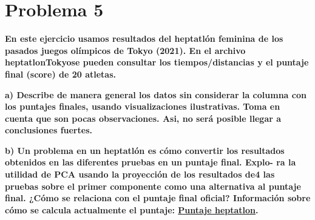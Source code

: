 \section*{Problema 5}

\textbf{En este ejercicio usamos resultados del heptatlón feminina de los pasados juegos olímpicos de Tokyo (2021). En el archivo heptatlonTokyose pueden consultar los tiempos/distancias y el puntaje final (score) de 20 atletas.}

\textbf{a) Describe de manera general los datos sin considerar la columna con los puntajes finales, usando visualizaciones ilustrativas. Toma en cuenta que son pocas observaciones. Asi, no será posible llegar a conclusiones fuertes.}

\textbf{b) Un problema en un heptatlón es cómo convertir los resultados
    obtenidos en las diferentes pruebas en un puntaje final. Explo-
    ra la utilidad de PCA usando la proyección de los resultados de4
    las pruebas sobre el primer componente como una alternativa al
    puntaje final. ¿Cómo se relaciona con el puntaje final oficial?
    Información sobre cómo se calcula actualmente el puntaje: \href{http://theaftermatter.blogspot.mx/2012/06/maths-of-heptathlon-why-scoring-system.html}{Puntaje heptatlon}.}